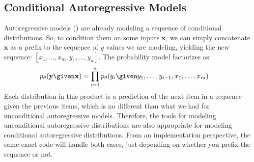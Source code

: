 
\subsection{Conditional Autoregressive Models}
Autoregressive models (\sect{\ref{sec:generative_models:autoregressive}}) are already modeling a sequence of conditional distributions. So, to condition them on some inputs $\mathbf{x}$, we can simply concatenate $\mathbf{x}$ as a prefix to the sequence of $y$ values we are modeling, yielding the new sequence: $[x_1, \ldots, x_m, y_1, \ldots, y_n]$. The probability model factorizes as:
\begin{align}
    p_{\theta}(\mathbf{y} \given \mathbf{x}) & = \prod_{i=1}^n p_{\theta}(y_i \given y_1, \ldots, y_{i-1}, x_1, \ldots, x_m)
\end{align}
Each distribution in this product is a prediction of the next item in a sequence given the previous items, which is no different than what we had for unconditional autoregressive models. Therefore, the tools for modeling unconditional autoregressive distributions are also appropriate for modeling conditional autoregressive distributions. From an implementation perspective, the same exact code will handle both cases, just depending on whether you prefix the sequence or not. %


